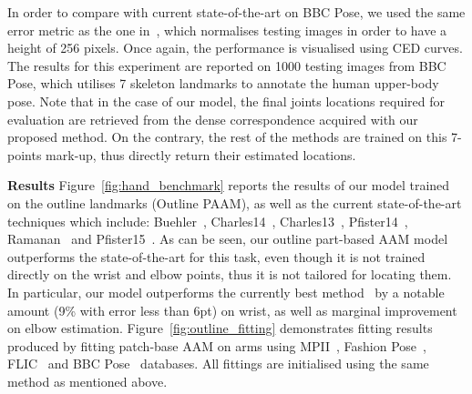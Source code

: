 In order to compare with current state-of-the-art on BBC Pose, we used the same error metric as the one in~\cite{pfister2015flowing}, which normalises testing images in order to have a height of 256 pixels. Once again, the performance is visualised using CED curves. The results for this experiment are reported on 1000 testing images from BBC Pose, which utilises 7 skeleton landmarks to annotate the human upper-body pose. Note that in the case of our model, the final joints locations required for evaluation are retrieved from the dense correspondence acquired with our proposed method. On the contrary, the rest of the methods are trained on this 7-points mark-up, thus directly return their estimated locations.

\noindent\textbf{Results} Figure~\ref{fig:hand_benchmark} reports the results of our model trained on the outline landmarks (Outline PAAM), as well as the current state-of-the-art techniques which include: Buehler~\cite{buehler2011upper}, Charles14~\cite{charles2014upper}, Charles13~\cite{charles2013domain}, Pfister14~\cite{pfister2015deep}, Ramanan~\cite{yang2013articulated} and Pfister15~\cite{pfister2015flowing}. As can be seen, our outline part-based AAM model outperforms the state-of-the-art for this task, even though it is not trained directly on the wrist and elbow points, thus it is not tailored for locating them. In particular, our model outperforms the currently best method~\cite{pfister2015flowing} by a notable amount (9\% with error less than 6pt) on wrist, as well as marginal improvement on elbow estimation. Figure~\ref{fig:outline_fitting} demonstrates fitting results produced by fitting patch-base AAM on arms using MPII~\cite{andriluka14cvpr}, Fashion Pose~\cite{dantone2013human}, FLIC~\cite{sapp2013modec} and BBC Pose~\cite{pfister2015flowing} databases. All fittings are initialised using the same method as mentioned above.

